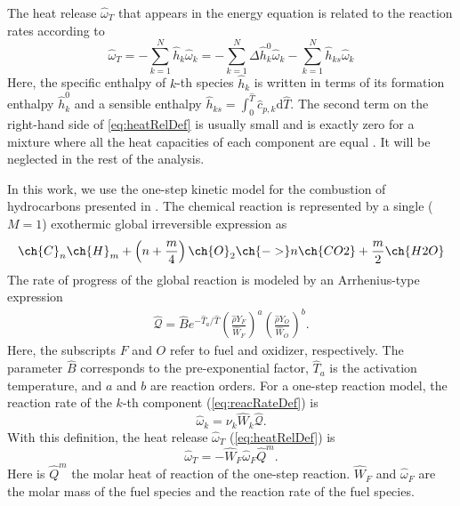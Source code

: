 The heat release $\hat \omega_T$ that appears in the energy equation is related to the reaction rates according to
\begin{equation}\label{eq:heatRelDef}
\hat \omega _T = - \sum_{k=1}^{N} \hat h_k\hat\omega_k = - \sum_{k=1}^{N}   \Delta \hat h_k^0 \hat\omega_k   - \sum_{k=1}^{N} \hat h_{ks} \hat\omega_k 
\end{equation}
Here, the specific enthalpy of $k$-th species $\hat h_k$  is written in terms of its formation enthalpy $\hat h_k^0$ and a sensible enthalpy $\hat h_{ks} =\int_{0}^{\hat{T}} \hat c_{p,k} \text{d}\hat{T} $. The second term on the right-hand side of \cref{eq:heatRelDef} is usually small and is exactly zero for a mixture where all the heat capacities of each component are equal \citep{poinsotTheoreticalNumericalCombustion2005}. It will be neglected in the rest of the analysis.
\newline

In this work, we use the one-step kinetic model for the combustion of hydrocarbons presented in \cite{fernandez-tarrazoSimpleOnestepChemistry2006}. The chemical reaction is represented by a single ($M = 1$)  exothermic global irreversible expression as
\begin{equation}
\ch{C}_n \ch{H}_m + \left(n+\frac{m}{4}\right) \ch{O}_2\ch{ -> } n \ch{CO2} + \frac{m}{2} \ch{H2O}
\end{equation}%
The rate of progress of the global reaction is modeled by an Arrhenius-type expression
\begin{align}
\hat{\mathcal{Q}}= \hat B e^{-\hat T_a/\hat T} \left(\frac{\hat \rho Y_F}{\hat W_F}\right)^a \left(\frac{\hat \rho Y_O}{\hat W_O}\right)^b . \label{eq:DimArr}
\end{align}%
Here, the subscripts $F$ and $O$ refer to fuel and oxidizer, respectively. The parameter $\hat{B}$ corresponds to the pre-exponential factor, $\hat T_a$ is the activation temperature, and $a$ and $b$ are reaction orders. For a one-step reaction model, the reaction rate of the $k$-th component (\cref{eq:reacRateDef}) is 
\begin{equation}
\hat \omega_k  =  \nu_{k} \hat W_k\hat{\mathcal{Q}}.
\end{equation}
With this definition, the heat release $\hat \omega_T$ (\cref{eq:heatRelDef}) is
\begin{equation}
\hat \omega_T = - \hat W_F \hat \omega_F\hat Q^m.
\end{equation}
Here is $\hat Q^m$ the molar heat of reaction of the one-step reaction. $\hat W_F$ and $ \hat \omega_F$ are the molar mass of the fuel species and the reaction rate of the fuel species. 

